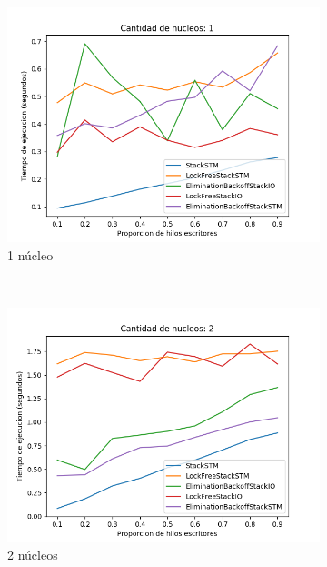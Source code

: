 \begin{figure}[t]
    \centering
    \begin{subfigure}[b]{0.49\textwidth}
        \includegraphics[width=\textwidth]{images/pushPercentages/plots/1.png}
        \caption{1 núcleo}
        \label{subfig:pushPercentages-1core}
    \end{subfigure}
    ~
    \begin{subfigure}[b]{0.49\textwidth}
        \includegraphics[width=\textwidth]{images/pushPercentages/plots/2.png}
        \caption{2 núcleos}
        \label{subfig:pushPercentages-2core}
    \end{subfigure}
    ~
    \begin{subfigure}[b]{0.5\textwidth}

\end{subfigure}
\end{figure}
